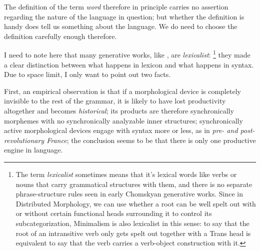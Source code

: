 \documentclass[UTF8, a4paper, oneside, scheme=plain, 12pt]{ctexrep}
\newcommand*{\term}[1]{\emph{#1}}
\newcommand{\form}[1]{\emph{#1}}
\begin{document}
{The definition of the term \term{word} 
therefore in principle carries no assertion regarding 
the nature of the language in question; 
but whether the definition is handy does tell us 
something about the language. 
We do need to choose the definition carefully enough therefore. 

I need to note here that 
many generative works, like \citet{deng2010formal},
are \emph{lexicalist}:%
\footnote{
    The term \term{lexicalist} sometimes means that  
    it's lexical words like verbs or nouns that carry grammatical structures with them, 
    and there is no separate phrase-structure rules 
    seen in early Chomskyan generative works.
    Since in Distributed Morphology, 
    we can use whether a root can be well spelt out 
    with or without certain functional heads surrounding it 
    to control its subcategorization,
    Minimalism is also lexicalist in this sense:
    to say that the root of an intransitive verb 
    only gets spelt out together with a Trans head 
    is equivalent to say that the verb carries a verb-object construction with it.
} 
they made a clear distinction between what happens in lexicon 
and what happens in syntax. 
Due to space limit, 
I only want to point out two facts.

First, an empirical observation is that 
if a morphological device is completely invisible to the rest of the grammar,
it is likely to have lost productivity altogether and becomes \emph{historical}; 
its products are therefore synchronically morphemes
with no synchronically analyzable inner structures; 
synchronically active morphological devices 
engage with syntax more or less, 
as in \form{pre- and post-revolutionary France};
the conclusion seems to be that there is only one productive engine in language. 

}
\end{document}
